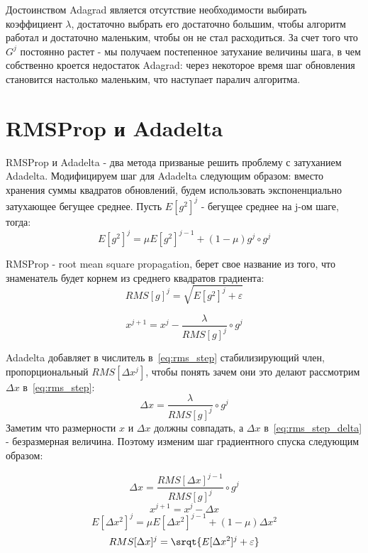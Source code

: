\documentclass[12pt]{report}
\begin{document}
    Достоинством Adagrad является отсутствие необходимости выбирать коэффициент
    $\lambda$, достаточно выбрать его достаточно большим, чтобы алгоритм работал
    и достаточно маленьким, чтобы он не стал расходиться. За счет того что $G^j$
    постоянно растет - мы получаем постепенное затухание величины шага, в чем
    собственно кроется недостаток Adagrad: через некоторое время шаг обновления
    становится настолько маленьким, что наступает паралич алгоритма.

  \section{RMSProp и Adadelta}
    RMSProp и Adadelta - два метода призваные решить проблему с затуханием
    Adadelta. Модифицируем шаг для Adadelta следующим образом: вместо хранения
    суммы квадратов обновлений, будем использовать экспоненциально затухающее
    бегущее среднее. Пусть $E[g^2]^j$ - бегущее среднее на j-ом шаге, тогда:
    \begin{equation}
      E[g^2]^j=\mu E[g^2]^{j-1} + (1 - \mu)g^j \circ g^j
    \end{equation}

    RMSProp - root mean square propagation, берет свое название из того, что
    знаменатель будет корнем из среднего квадратов градиента:
    \begin{equation}
      RMS[g]^j = \sqrt{E[g^2]^j + \varepsilon}
    \end{equation}

    \begin{equation} \label{eq:rms_step}
      x^{j+1} = x^j - \frac{\lambda}{RMS[g]^j} \circ g^j
    \end{equation}

    Adadelta добавляет в числитель в~\ref{eq:rms_step} стабилизирующий член,
    пропорциональный $RMS[\Delta x^j]$, чтобы понять зачем они это делают
    рассмотрим $\Delta x$ в~\ref{eq:rms_step}:
    \begin{equation} \label{eq:rms_step_delta}
      \Delta x = \frac{\lambda}{RMS[g]^j} \circ g^j
    \end{equation}
    Заметим что размерности $x$ и $\Delta x$ должны совпадать, а $\Delta x$
    в~\ref{eq:rms_step_delta} - безразмерная величина. Поэтому изменим шаг градиентного
    спуска следующим образом:

    \begin{equation}
      \Delta x = \frac{RMS[\Delta x]^{j-1}}{RMS[g]^j} \circ g^j
    \end{equation}
    \begin{equation}
      x^{j+1} = x^j - \Delta x
    \end{equation}
    \begin{equation}
      E[\Delta x^2]^j = \mu E[\Delta x^2]^{j-1} + (1 - \mu)\Delta x^2
    \end{equation}
    \begin{equation}
      RMS[\Delta x]^j = \srqt{E[\Delta x^2]^j + \varepsilon}
    \end{equation}
\end{document}
